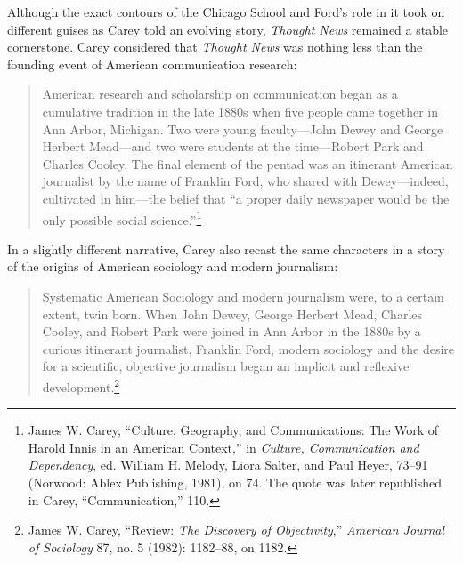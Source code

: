 \documentclass[twoside,symmetric,nobib,justified]{tufte-book}
\begin{document}
Although the exact contours of the Chicago School and Ford's role in it
took on different guises as Carey told an evolving story, \emph{Thought
News} remained a stable cornerstone. Carey considered that \emph{Thought
News} was nothing less than the founding event of American communication
research:

\begin{quote}
American research and scholarship on communication began as a cumulative
tradition in the late 1880s when five people came together in Ann Arbor,
Michigan. Two were young faculty---John Dewey and George Herbert
Mead---and two were students at the time---Robert Park and Charles
Cooley. The final element of the pentad was an itinerant American
journalist by the name of Franklin Ford, who shared with Dewey---indeed,
cultivated in him---the belief that ``a proper daily newspaper would be
the only possible social science.''\footnote{James W. Carey, ``Culture,
  Geography, and Communications: The Work of Harold Innis in an American
  Context,'' in \emph{Culture, Communication and Dependency}, ed.
  William H. Melody, Liora Salter, and Paul Heyer, 73--91 (Norwood:
  Ablex Publishing, 1981), on 74. The quote was later republished in
  Carey, ``Communication,'' 110.}
\end{quote}

\noindent In a slightly different narrative, Carey also recast the same characters
in a story of the origins of American sociology and modern journalism:

\begin{quote}
Systematic American Sociology and modern journalism were, to a certain
extent, twin born. When John Dewey, George Herbert Mead, Charles Cooley,
and Robert Park were joined in Ann Arbor in the 1880s by a curious
itinerant journalist, Franklin Ford, modern sociology and the desire for
a scientific, objective journalism began an implicit and reflexive
development.\footnote{James W. Carey, ``Review: \emph{The Discovery of
  Objectivity},'' \emph{American Journal of Sociology} 87, no. 5 (1982):
  1182--88, on 1182.}
\end{quote}
\end{document}
